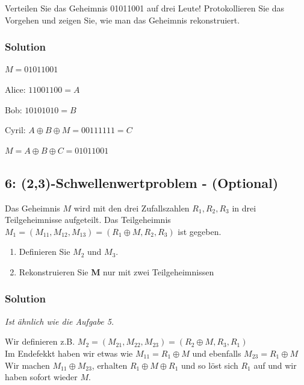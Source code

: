 \documentclass[11pt]{article}
\providecommand{\tightlist}{%
      \setlength{\itemsep}{0pt}\setlength{\parskip}{0pt}}
\begin{document}
Verteilen Sie das Geheimnis 01011001 auf drei Leute! Protokollieren Sie
das Vorgehen und zeigen Sie, wie man das Geheimnis rekonstruiert.

\hypertarget{solution}{%
\subsubsection{Solution}\label{solution}}

\(M = 01011001\)

Alice: \(11001100 = A\)

Bob: \(10101010 = B\)

Cyril: \(A \oplus B \oplus M = 00111111 = C\)

\(M = A \oplus B \oplus C = 01011001\)

    \hypertarget{aufgabe-6-23-schwellenwertproblem---optional}{%
\subsection{6: (2,3)-Schwellenwertproblem -
(Optional)}\label{aufgabe-6-23-schwellenwertproblem---optional}}

Das Geheimnis \(M\) wird mit den drei Zufallszahlen \(R_1, R_2, R_3\) in
drei Teilgeheimnisse aufgeteilt. Das Teilgeheimnis
\(M_1=(M_{11},M_{12},M_{13})=(R_1 \oplus M, R_2,R_3)\) ist gegeben.

\begin{enumerate}
\def\labelenumi{\arabic{enumi}.}
\tightlist
\item
  Definieren Sie \(M_2\) und \(M_3\).\\
\item
  Rekonstruieren Sie \textbf{M} nur mit zwei Teilgeheimnissen
\end{enumerate}

\hypertarget{solution}{%
\subsubsection{Solution}\label{solution}}

\emph{Ist ähnlich wie die Aufgabe 5.}

Wir definieren z.B.
\(M_2=(M_{21},M_{22},M_{23})=(R_2 \oplus M, R_3,R_1)\)\\
Im Endefekkt haben wir etwas wie \(M_{11} = R_1 \oplus M\) und ebenfalls
\(M_{23} = R_1 \oplus M\)\\
Wir machen \(M_{11} \oplus M_{23}\), erhalten  \(R_{1} \oplus M \oplus R_{1}\) und so löst sich \(R_1\) auf und wir
haben sofort wieder \(M\).
\end{document}
